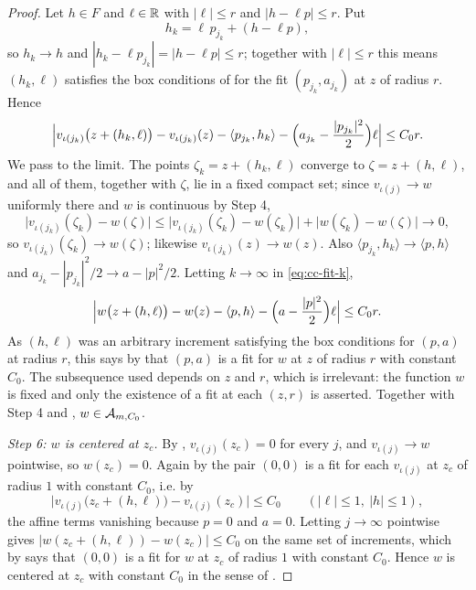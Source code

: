\begin{proof}
Let $h\in F$ and $\ell\in\mathbb{R}$ with $|\ell|\le r$ and $|h-\ell p|\le r$. Put
\[
  h_k=\ell\,p_{j_k}+(h-\ell p),
\]
so $h_k\to h$ and $|h_k-\ell p_{j_k}|=|h-\ell p|\le r$; together with
$|\ell|\le r$ this means $(h_k,\ell)$ satisfies the box conditions of
 for the fit $(p_{j_k},a_{j_k})$ at $z$ of radius $r$. Hence
\begin{equation}\label{eq:cc-fit-k}
  \Bigl|v_{\iota(j_k)}\bigl(z+(h_k,\ell)\bigr)-v_{\iota(j_k)}(z)
    -\langle p_{j_k},h_k\rangle
    -\Bigl(a_{j_k}-\frac{|p_{j_k}|^2}{2}\Bigr)\ell\Bigr|\le C_0r .
\end{equation}
We pass to the limit. The points $\zeta_k=z+(h_k,\ell)$ converge to
$\zeta=z+(h,\ell)$, and all of them, together with $\zeta$, lie in a fixed
compact set; since $v_{\iota(j)}\to w$ uniformly there and $w$ is continuous by
Step 4,
\[
  \bigl|v_{\iota(j_k)}(\zeta_k)-w(\zeta)\bigr|
   \le\bigl|v_{\iota(j_k)}(\zeta_k)-w(\zeta_k)\bigr|+\bigl|w(\zeta_k)-w(\zeta)\bigr|
   \longrightarrow0 ,
\]
so $v_{\iota(j_k)}(\zeta_k)\to w(\zeta)$; likewise
$v_{\iota(j_k)}(z)\to w(z)$. Also
$\langle p_{j_k},h_k\rangle\to\langle p,h\rangle$ and
$a_{j_k}-|p_{j_k}|^2/2\to a-|p|^2/2$. Letting $k\to\infty$ in
\eqref{eq:cc-fit-k},
\[
  \Bigl|w\bigl(z+(h,\ell)\bigr)-w(z)-\langle p,h\rangle
    -\Bigl(a-\frac{|p|^2}{2}\Bigr)\ell\Bigr|\le C_0r .
\]
As $(h,\ell)$ was an arbitrary increment satisfying the box conditions for
$(p,a)$ at radius $r$, this says by  that $(p,a)$ is a fit for
$w$ at $z$ of radius $r$ with constant $C_0$. The subsequence used depends on
$z$ and $r$, which is irrelevant: the function $w$ is fixed and only the
existence of a fit at each $(z,r)$ is asserted. Together with Step 4 and
, $w\in\mathcal{A}_{m,C_0}$.

\emph{Step 6: $w$ is centered at $z_c$.}
By , $v_{\iota(j)}(z_c)=0$ for every $j$, and
$v_{\iota(j)}\to w$ pointwise, so $w(z_c)=0$. Again by
 the pair $(0,0)$ is a fit for each $v_{\iota(j)}$ at
$z_c$ of radius $1$ with constant $C_0$, i.e. by 
\[
  \bigl|v_{\iota(j)}\bigl(z_c+(h,\ell)\bigr)-v_{\iota(j)}(z_c)\bigr|\le C_0
  \qquad(|\ell|\le1,\ |h|\le1),
\]
the affine terms vanishing because $p=0$ and $a=0$. Letting $j\to\infty$
pointwise gives $\bigl|w(z_c+(h,\ell))-w(z_c)\bigr|\le C_0$ on the same set of
increments, which by  says that $(0,0)$ is a fit for $w$ at $z_c$
of radius $1$ with constant $C_0$. Hence $w$ is centered at $z_c$ with constant
$C_0$ in the sense of .
\end{proof}
